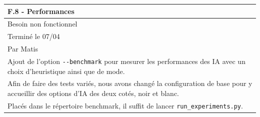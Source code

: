 \documentclass[a4paper,12pt]{article}
\begin{document}
\noindent
\setlength{\arrayrulewidth}{1.5pt}
\renewcommand{\arraystretch}{1.5}
\begin{tabularx}{\textwidth}{|X|}
    \hline
    \textbf{F.8 - Performances}                                                                                                                  \\
    \hline
    Besoin non fonctionnel                                                                                                                       \\
    \hline
    Terminé le 07/04                                                                                                                             \\
    Par Matis                                                                                                                                    \\
    \hline
    Ajout de l’option \texttt{-}\texttt{-benchmark} pour mesurer les performances des IA avec un choix d’heuristique ainsi que de mode.          \\
    \arrayrulecolor{MediumAquamarine}\hline
    \arrayrulecolor{RoyalBlue}
    Afin de faire des tests variés, nous avons changé la configuration de base pour y accueillir des options d’IA des deux cotés, noir et blanc. \\
    Placés dans le répertoire benchmark, il suffit de lancer \texttt{run\_experiments.py}.                                                       \\
    \hline
\end{tabularx}

\vspace{1cm}
\end{document}
